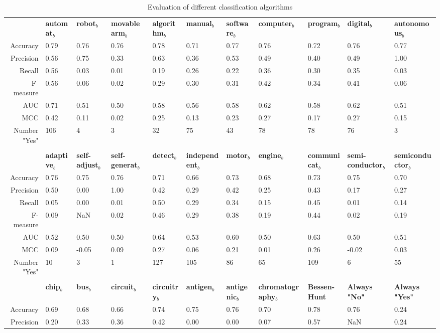 \begin{table}
\begin{small}
\begin{threeparttable}
\caption{{\normalsize Evaluation of different classification algorithms}}
\label{table:table_compare_classalg}
\begin{tabular}{rllllllllll}
\toprule 
 & \textbf{automat$_b$} & \textbf{robot$_b$} & \textbf{movable arm$_b$} & \textbf{algorithm$_b$} & \textbf{manual$_b$} & \textbf{software$_b$} & \textbf{computer$_b$} & \textbf{program$_b$} & \textbf{digital$_b$} & \textbf{autonomous$_b$}  \tabularnewline 
Accuracy & 0.79 & 0.76 & 0.76 & 0.78 & 0.71 & 0.77 & 0.76 & 0.72 & 0.76 & 0.77  \tabularnewline 
Precision & 0.56 & 0.75 & 0.33 & 0.63 & 0.36 & 0.53 & 0.49 & 0.40 & 0.49 & 1.00  \tabularnewline 
Recall & 0.56 & 0.03 & 0.01 & 0.19 & 0.26 & 0.22 & 0.36 & 0.30 & 0.35 & 0.03  \tabularnewline 
F-measure & 0.56 & 0.06 & 0.02 & 0.29 & 0.30 & 0.31 & 0.42 & 0.34 & 0.41 & 0.06  \tabularnewline 
AUC & 0.71 & 0.51 & 0.50 & 0.58 & 0.56 & 0.58 & 0.62 & 0.58 & 0.62 & 0.51  \tabularnewline 
MCC & 0.42 & 0.11 & 0.02 & 0.25 & 0.13 & 0.23 & 0.27 & 0.17 & 0.27 & 0.15  \tabularnewline 
Number "Yes" & 106 & 4 & 3 & 32 & 75 & 43 & 78 & 78 & 76 & 3  \tabularnewline 
\tabularnewline 
 & \textbf{adaptive$_b$} & \textbf{self-adjust$_b$} & \textbf{self-generat$_b$} & \textbf{detect$_b$} & \textbf{independent$_b$} & \textbf{motor$_b$} & \textbf{engine$_b$} & \textbf{communicat$_b$} & \textbf{semi-conductor$_b$} & \textbf{semiconductor$_b$}  \tabularnewline 
Accuracy & 0.76 & 0.75 & 0.76 & 0.71 & 0.66 & 0.73 & 0.68 & 0.73 & 0.75 & 0.70  \tabularnewline 
Precision & 0.50 & 0.00 & 1.00 & 0.42 & 0.29 & 0.42 & 0.25 & 0.43 & 0.17 & 0.27  \tabularnewline 
Recall & 0.05 & 0.00 & 0.01 & 0.50 & 0.29 & 0.34 & 0.15 & 0.45 & 0.01 & 0.14  \tabularnewline 
F-measure & 0.09 & NaN & 0.02 & 0.46 & 0.29 & 0.38 & 0.19 & 0.44 & 0.02 & 0.19  \tabularnewline 
AUC & 0.52 & 0.50 & 0.50 & 0.64 & 0.53 & 0.60 & 0.50 & 0.63 & 0.50 & 0.51  \tabularnewline 
MCC & 0.09 & -0.05 & 0.09 & 0.27 & 0.06 & 0.21 & 0.01 & 0.26 & -0.02 & 0.03  \tabularnewline 
Number "Yes" & 10 & 3 & 1 & 127 & 105 & 86 & 65 & 109 & 6 & 55  \tabularnewline 
\tabularnewline 
 & \textbf{chip$_b$} & \textbf{bus$_b$} & \textbf{circuit$_b$} & \textbf{circuitry$_b$} & \textbf{antigen$_b$} & \textbf{antigenic$_b$} & \textbf{chromatography$_b$} & \textbf{Bessen-Hunt} & \textbf{Always "No"} & \textbf{Always "Yes"}  \tabularnewline 
Accuracy & 0.69 & 0.68 & 0.66 & 0.74 & 0.75 & 0.76 & 0.70 & 0.78 & 0.76 & 0.24  \tabularnewline 
Precision & 0.20 & 0.33 & 0.36 & 0.42 & 0.00 & 0.00 & 0.07 & 0.57 & NaN & 0.24  \tabularnewline 

\end{tabular}
\end{threeparttable}
\end{small}
\end{table}
